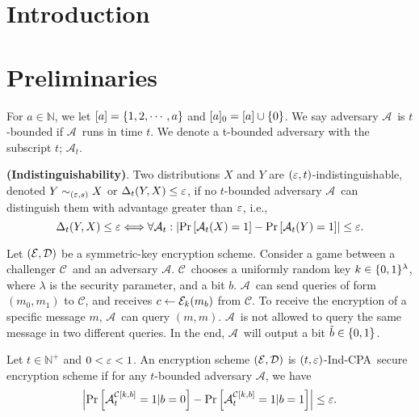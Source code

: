 \documentclass{article}
\newcommand{\tcpa}{$(t,\eps)$-Ind-CPA}
\def\E{{\cal E}}
\def\D{{\cal D}}
\def\a {${\mathcal A}$}
\def\ch {${\mathcal C}$}
\newcommand{\NN}{{\mathbb{N}}}
\begin{document}
\title{}
\author{}

\maketitle

\def \cF {\F}

\begin{abstract}
\end{abstract}

\section{Introduction}
\section{Preliminaries}

For $a\in \NN$, we let $[a]=\left\{ 1,2, \cdots, a \right\}$ and $[a]_0=[a]\cup \left\{ 0 \right\}$. We say adversary \a~is $t$-bounded if \a~runs in time $t$. We denote a t-bounded adversary with the subscript $t$; $\mathcal{A}_t$.

\begin{definition}\textbf{(Indistinguishability)}. Two distributions $X$ and $Y$ are $(\varepsilon,t)$-indistinguishable, denoted $Y \sim_{(\varepsilon,s)} X$ or $\Delta_{t}(Y,X)\leq \varepsilon$, if  no $t$-bounded adversary \a~can distinguish them with advantage greater than $\varepsilon$, i.e., \[ \Delta_{t}(Y,X)\leq \varepsilon \Longleftrightarrow \forall \mathcal{A}_t : \left| \Pr \left[ \mathcal{A}_t(X)=1 \right]-\Pr \left[ \mathcal{A}_t(Y)=1 \right]  \right|\leq \varepsilon. \]
\end{definition}

Let $(\E,\D)$ be a symmetric-key encryption scheme. Consider a game between a challenger \ch~and an adversary \a. \ch~chooses a uniformly random key $k\in \{0,1\}^\lambda$, where $\lambda$ is the security parameter, and a bit $b$. \a~can send queries of form $(m_0,m_1)$ to \ch, and receives $c\leftarrow \E_k(m_b)$ from \ch. To receive the encryption of a specific message $m$, \a~can query $(m,m)$. \a~is not allowed to query the same message in two different queries. In the end, \a~will output a bit $\tilde{b}\in \{0,1\}$. 

\begin{definition} Let $t \in \NN^+$ and $0<\varepsilon <1$. An encryption scheme $(\E,\D)$ is \tcpa~secure encryption scheme if for any $t$-bounded adversary \a, we have $$\left| \Pr \left[ \mathcal{A}_t^{\mathcal{C}[k,b]}=1|b=0 \right] - \Pr \left[ \mathcal{A}_t^{\mathcal{C}[k,b]}=1|b=1 \right]  \right|\leq \varepsilon.$$
\end{definition}
\end{document}
